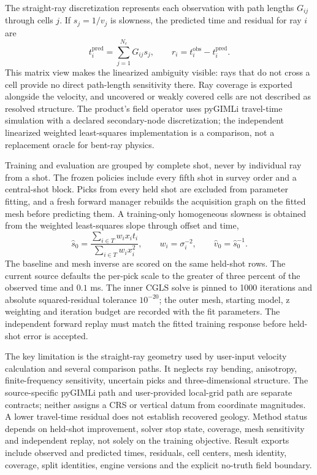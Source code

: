The straight-ray discretization represents each observation with path
lengths \(G_{ij}\) through cells \(j\). If \(s_j=1/v_j\) is slowness,
the predicted time and residual for ray \(i\) are
\begin{equation}\label{eq:tt-forward}
 t_i^{\mathrm{pred}}=\sum_{j=1}^{N_c}G_{ij}s_j,\qquad
 r_i=t_i^{\mathrm{obs}}-t_i^{\mathrm{pred}}.
\end{equation}
This matrix view makes the linearized ambiguity visible: rays that do
not cross a cell provide no direct path-length sensitivity there. Ray
coverage is exported alongside the velocity, and uncovered or weakly
covered cells are not described as resolved structure. The product's
field operator uses pyGIMLi travel-time simulation with a declared
secondary-node discretization; the independent linearized weighted
least-squares implementation is a comparison, not a replacement oracle
for bent-ray physics.

Training and evaluation are grouped by complete shot, never by
individual ray from a shot. The frozen policies include every fifth shot
in survey order and a central-shot block. Picks from every held shot are
excluded from parameter fitting, and a fresh forward manager rebuilds
the acquisition graph on the fitted mesh before predicting them. A
training-only homogeneous slowness is obtained from the weighted
least-squares slope through offset and time,
\begin{equation}\label{eq:tt-baseline}
 \widehat{s}_0=
 \frac{\sum_{i\in T}w_i x_i t_i}
 {\sum_{i\in T}w_i x_i^2},\qquad
 w_i=\sigma_i^{-2},\qquad
 \widehat{v}_0=\widehat{s}_0^{-1}.
\end{equation}
The baseline and mesh inverse are scored on the same held-shot rows.
The current source defaults the per-pick scale to the greater of three
percent of the observed time and \(0.1\) ms. The inner CGLS solve is
pinned to 1000 iterations and absolute squared-residual tolerance
\(10^{-20}\); the outer mesh, starting model, z weighting and iteration
budget are recorded with the fit parameters. The independent forward replay must
match the fitted training response before held-shot error is accepted.

The key limitation is the straight-ray geometry used by user-input
velocity calculation and several comparison paths. It neglects ray
bending, anisotropy, finite-frequency sensitivity, uncertain picks and
three-dimensional structure. The source-specific pyGIMLi path and
user-provided local-grid path are separate contracts; neither assigns a
CRS or vertical datum from coordinate magnitudes. A lower travel-time
residual does not establish recovered geology. Method status depends on
held-shot improvement, solver stop state, coverage, mesh sensitivity
and independent replay, not solely on the training objective. Result
exports include observed and predicted times, residuals, cell centers,
mesh identity, coverage, split identities, engine versions and the
explicit no-truth field boundary.

